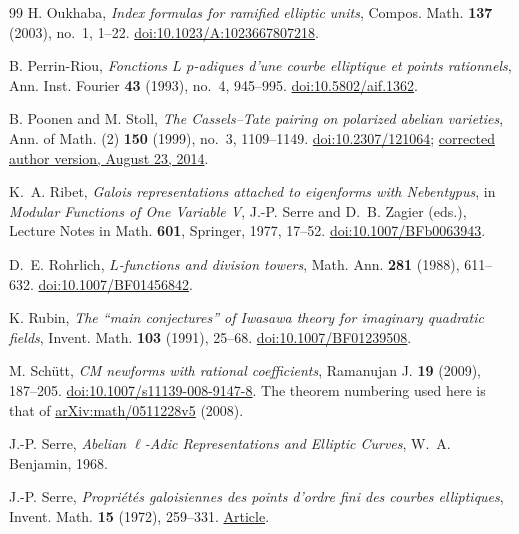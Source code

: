 \begin{thebibliography}{99}
H. Oukhaba,
\emph{Index formulas for ramified elliptic units},
Compos. Math. \textbf{137} (2003), no.~1, 1--22.
\href{https://doi.org/10.1023/A:1023667807218}{doi:10.1023/A:1023667807218}.

B. Perrin-Riou,
\emph{Fonctions $L$ $p$-adiques d'une courbe elliptique et points rationnels},
Ann. Inst. Fourier \textbf{43} (1993), no.~4, 945--995.
\href{https://doi.org/10.5802/aif.1362}{doi:10.5802/aif.1362}.

B. Poonen and M. Stoll,
\emph{The Cassels--Tate pairing on polarized abelian varieties},
Ann. of Math. (2) \textbf{150} (1999), no.~3, 1109--1149.
\href{https://doi.org/10.2307/121064}{doi:10.2307/121064};
\href{https://math.mit.edu/~poonen/papers/sha.pdf}{corrected author version, August 23, 2014}.

K.~A. Ribet,
\emph{Galois representations attached to eigenforms with Nebentypus},
in \emph{Modular Functions of One Variable V},
J.-P. Serre and D.~B. Zagier (eds.),
Lecture Notes in Math. \textbf{601}, Springer, 1977, 17--52.
\href{https://doi.org/10.1007/BFb0063943}{doi:10.1007/BFb0063943}.

D.~E. Rohrlich,
\emph{$L$-functions and division towers},
Math. Ann. \textbf{281} (1988), 611--632.
\href{https://doi.org/10.1007/BF01456842}{doi:10.1007/BF01456842}.

K. Rubin,
\emph{The ``main conjectures'' of Iwasawa theory for imaginary quadratic fields},
Invent. Math. \textbf{103} (1991), 25--68.
\href{https://doi.org/10.1007/BF01239508}{doi:10.1007/BF01239508}.

M. Sch\"utt,
\emph{CM newforms with rational coefficients},
Ramanujan J. \textbf{19} (2009), 187--205.
\href{https://doi.org/10.1007/s11139-008-9147-8}{doi:10.1007/s11139-008-9147-8}.
The theorem numbering used here is that of
\href{https://arxiv.org/abs/math/0511228v5}{arXiv:math/0511228v5} (2008).

J.-P. Serre,
\emph{Abelian $\ell$-Adic Representations and Elliptic Curves},
W.~A. Benjamin, 1968.

J.-P. Serre,
\emph{Propri\'et\'es galoisiennes des points d'ordre fini des courbes elliptiques},
Invent. Math. \textbf{15} (1972), 259--331.
\href{https://www.college-de-france.fr/media/jean-pierre-serre/UPL5874918517843398173_Serre_proprie_te_s_galoisiennes_des_courbes_elliptiques.pdf}{Article}.


\end{thebibliography}
